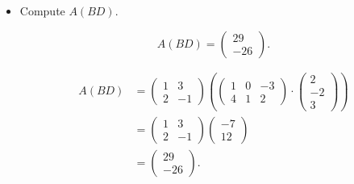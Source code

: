 \begin{Exercise}
\begin{itemize}
		\item Compute $A(B D)$.
		\begin{answer}
			$$
			A(B D) = \begin{pmatrix}
			29 \\
			-26
			\end{pmatrix}.
			$$
		\end{answer}
		\begin{solution}
			\begin{align*}
			A(B D)
			&= \begin{pmatrix}
			1 & 3 \\
			2 & -1
			\end{pmatrix} \left( \begin{pmatrix}
			1 & 0 & -3 \\
			4 & 1 & 2
			\end{pmatrix} \cdot \begin{pmatrix}
			2 \\
			-2 \\
			3
			\end{pmatrix} \right)\\
			&= \begin{pmatrix}
			1 & 3 \\
			2 & -1
			\end{pmatrix} \begin{pmatrix}
			-7 \\
			12
			\end{pmatrix} \\
			&= \begin{pmatrix}
			29 \\
			-26
			\end{pmatrix}.
			\end{align*}
		\end{solution}
		
	\end{itemize}
\end{Exercise}